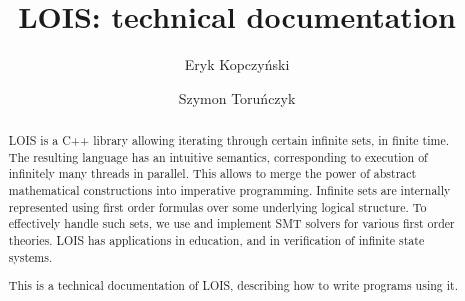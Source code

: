 \documentclass[a4paper]{article}
\title{LOIS: technical documentation}
\author{Eryk Kopczy\'nski \and Szymon Toru\'nczyk}
\begin{document}
 
\maketitle

\begin{abstract}
LOIS is a C++ library allowing iterating through certain infinite sets, in finite time.
The resulting language has an intuitive semantics,
corresponding to execution of infinitely 
many threads in parallel.
This allows to merge the power of abstract mathematical constructions 
into imperative programming.
Infinite sets are internally represented 
using first order formulas over some underlying logical structure. 
To effectively handle such sets, we use and implement SMT solvers for various first order
theories. LOIS has applications in education, and in verification of infinite state systems.

This is a technical documentation of LOIS, describing how to write programs using it.
\end{abstract}














\def\whereislois{See \url{http://www.mimuw.edu.pl/~erykk/lois/}}

{}


%
\end{document}
